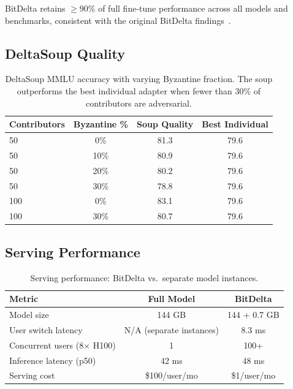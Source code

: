 \documentclass[11pt,letterpaper]{article}
\begin{document}
BitDelta retains $\geq 90\%$ of full fine-tune performance across all models and benchmarks, consistent with the original BitDelta findings~\cite{liu2024bitdelta}.

\subsection{DeltaSoup Quality}

\begin{table}[t]
\centering
\begin{tabular}{lccc}
\toprule
\textbf{Contributors} & \textbf{Byzantine \%} & \textbf{Soup Quality} & \textbf{Best Individual} \\
\midrule
50 & 0\% & 81.3 & 79.6 \\
50 & 10\% & 80.9 & 79.6 \\
50 & 20\% & 80.2 & 79.6 \\
50 & 30\% & 78.8 & 79.6 \\
100 & 0\% & 83.1 & 79.6 \\
100 & 30\% & 80.7 & 79.6 \\
\bottomrule
\end{tabular}
\caption{DeltaSoup MMLU accuracy with varying Byzantine fraction. The soup outperforms the best individual adapter when fewer than 30\% of contributors are adversarial.}
\label{tab:soup}
\end{table}

\subsection{Serving Performance}

\begin{table}[t]
\centering
\begin{tabular}{lcc}
\toprule
\textbf{Metric} & \textbf{Full Model} & \textbf{BitDelta} \\
\midrule
Model size & 144 GB & 144 + 0.7 GB \\
User switch latency & N/A (separate instances) & 8.3 ms \\
Concurrent users (8$\times$ H100) & 1 & 100+ \\
Inference latency (p50) & 42 ms & 48 ms \\
Serving cost & \$100/user/mo & \$1/user/mo \\
\bottomrule
\end{tabular}
\caption{Serving performance: BitDelta vs.\ separate model instances.}
\label{tab:serving}
\end{table}
\end{document}
